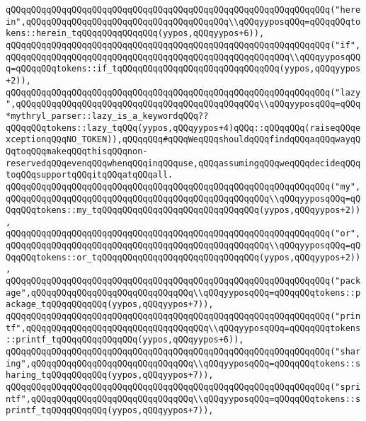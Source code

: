 \verb|qQQqqQQqqQQqqQQqqQQqqQQqqQQqqQQqqQQqqQQqqQQqqQQqqQQqqQQqqQQqqQQq("herein",qQQqqQQqqQQqqQQqqQQqqQQqqQQqqQQqqQQqqQQq\\qQQqyyposqQQq=qQQqqQQqtokens::herein_tqQQqqQQqqQQqqQQq(yypos,qQQqyypos+6)),|\newline
\verb|qQQqqQQqqQQqqQQqqQQqqQQqqQQqqQQqqQQqqQQqqQQqqQQqqQQqqQQqqQQqqQQq("if",qQQqqQQqqQQqqQQqqQQqqQQqqQQqqQQqqQQqqQQqqQQqqQQqqQQqqQQq\\qQQqyyposqQQq=qQQqqQQqtokens::if_tqQQqqQQqqQQqqQQqqQQqqQQqqQQqqQQq(yypos,qQQqyypos+2)),|\newline
\verb|qQQqqQQqqQQqqQQqqQQqqQQqqQQqqQQqqQQqqQQqqQQqqQQqqQQqqQQqqQQqqQQq("lazy",qQQqqQQqqQQqqQQqqQQqqQQqqQQqqQQqqQQqqQQqqQQqqQQq\\qQQqyyposqQQq=qQQq*mythryl_parser::lazy_is_a_keywordqQQq??qQQqqQQqtokens::lazy_tqQQq(yypos,qQQqyypos+4)qQQq::qQQqqQQq(raiseqQQqexceptionqQQqNO_TOKEN)),qQQqqQQq#qQQqWeqQQqshouldqQQqfindqQQqaqQQqwayqQQqtoqQQqmakeqQQqthisqQQqnon-reservedqQQqevenqQQqwhenqQQqinqQQquse,qQQqassumingqQQqweqQQqdecideqQQqtoqQQqsupportqQQqitqQQqatqQQqall.|\newline
\verb|qQQqqQQqqQQqqQQqqQQqqQQqqQQqqQQqqQQqqQQqqQQqqQQqqQQqqQQqqQQqqQQq("my",qQQqqQQqqQQqqQQqqQQqqQQqqQQqqQQqqQQqqQQqqQQqqQQqqQQq\\qQQqyyposqQQq=qQQqqQQqtokens::my_tqQQqqQQqqQQqqQQqqQQqqQQqqQQqqQQq(yypos,qQQqyypos+2)),|\newline
\verb|qQQqqQQqqQQqqQQqqQQqqQQqqQQqqQQqqQQqqQQqqQQqqQQqqQQqqQQqqQQqqQQq("or",qQQqqQQqqQQqqQQqqQQqqQQqqQQqqQQqqQQqqQQqqQQqqQQqqQQq\\qQQqyyposqQQq=qQQqqQQqtokens::or_tqQQqqQQqqQQqqQQqqQQqqQQqqQQqqQQq(yypos,qQQqyypos+2)),|\newline
\verb|qQQqqQQqqQQqqQQqqQQqqQQqqQQqqQQqqQQqqQQqqQQqqQQqqQQqqQQqqQQqqQQq("package",qQQqqQQqqQQqqQQqqQQqqQQqqQQqqQQq\\qQQqyyposqQQq=qQQqqQQqtokens::package_tqQQqqQQqqQQq(yypos,qQQqyypos+7)),|\newline
\verb|qQQqqQQqqQQqqQQqqQQqqQQqqQQqqQQqqQQqqQQqqQQqqQQqqQQqqQQqqQQqqQQq("printf",qQQqqQQqqQQqqQQqqQQqqQQqqQQqqQQqqQQq\\qQQqyyposqQQq=qQQqqQQqtokens::printf_tqQQqqQQqqQQqqQQq(yypos,qQQqyypos+6)),|\newline
\verb|qQQqqQQqqQQqqQQqqQQqqQQqqQQqqQQqqQQqqQQqqQQqqQQqqQQqqQQqqQQqqQQq("sharing",qQQqqQQqqQQqqQQqqQQqqQQqqQQqqQQq\\qQQqyyposqQQq=qQQqqQQqtokens::sharing_tqQQqqQQqqQQq(yypos,qQQqyypos+7)),|\newline
\verb|qQQqqQQqqQQqqQQqqQQqqQQqqQQqqQQqqQQqqQQqqQQqqQQqqQQqqQQqqQQqqQQq("sprintf",qQQqqQQqqQQqqQQqqQQqqQQqqQQqqQQq\\qQQqyyposqQQq=qQQqqQQqtokens::sprintf_tqQQqqQQqqQQq(yypos,qQQqyypos+7)),|\newline

